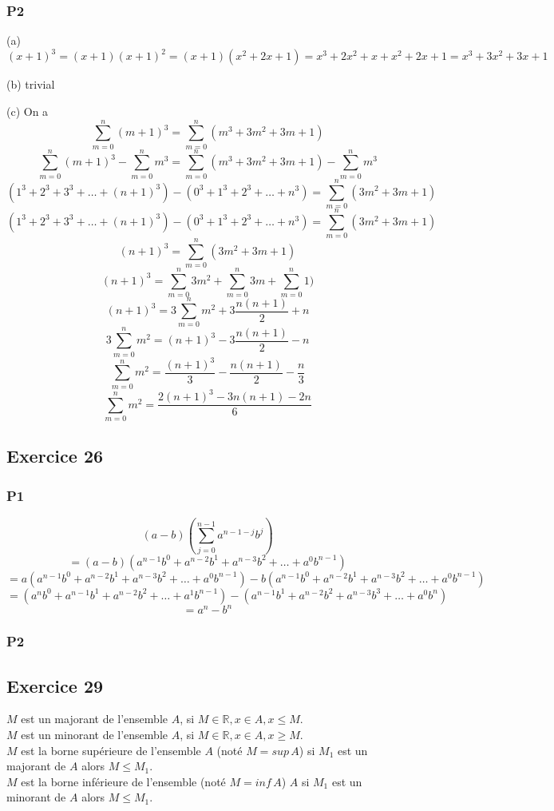 \documentclass[]{book}
\theoremstyle{definition}
\newcommand{\bb}[1]{\mathbb{#1}}
\newcommand{\R}{\bb{R}}
\begin{document}
\subsubsection*{P2}
(a) $$(x+1)^3 = (x+1)(x+1)^2 = (x+1)(x^2+2x+1) = x^3+2x^2+x+x^2+2x+1=x^3+3x^2+3x+1$$


(b) trivial

(c) 
On a 
$$\sum_{m=0}^{n}(m+1)^3 = \sum_{m=0}^{n}(m^3+3m^2+3m+1)$$
$$\sum_{m=0}^{n}(m+1)^3 - \sum_{m=0}^{n}m^3 = \sum_{m=0}^{n}(m^3+3m^2+3m+1) - \sum_{m=0}^{n}m^3 $$
$$(1^3+2^3+3^3+\ldots+(n+1)^3)-(0^3+1^3+2^3+\ldots+n^3) = \sum_{m=0}^{n}(3m^2+3m+1)$$
$$(1^3+2^3+3^3+\ldots+(n+1)^3)-(0^3+1^3+2^3+\ldots+n^3) = \sum_{m=0}^{n}(3m^2+3m+1)$$
$$(n+1)^3 = \sum_{m=0}^{n}(3m^2+3m+1)$$
$$(n+1)^3 = \sum_{m=0}^{n}3m^2+\sum_{m=0}^{n}3m+\sum_{m=0}^{n}1)$$
$$(n+1)^3 = 3\sum_{m=0}^{n}m^2+3\frac{n(n+1)}{2}+n$$
$$3\sum_{m=0}^{n}m^2 = (n+1)^3 - 3\frac{n(n+1)}{2} -n$$
$$\sum_{m=0}^{n}m^2 = \frac{(n+1)^3}{3} - \frac{n(n+1)}{2} - \frac{n}{3}$$
$$\sum_{m=0}^{n}m^2 = \frac{2(n+1)^3 -3n(n+1) -2n}{6}$$

\subsection*{Exercice 26}
\subsubsection*{P1}

$$(a-b)(\sum_{j=0}^{n-1}a^{n-1-j}b^j)$$
$$= (a-b)(a^{n-1}b^{0} + a^{n-2}b^{1} + a^{n-3}b^{2} + \ldots + a^{0}b^{n-1})$$
$$= a(a^{n-1}b^{0} + a^{n-2}b^{1} + a^{n-3}b^{2} + \ldots + a^{0}b^{n-1}) - b(a^{n-1}b^{0} + a^{n-2}b^{1} + a^{n-3}b^{2} + \ldots + a^{0}b^{n-1})$$
$$= (a^{n}b^{0} + a^{n-1}b^{1} + a^{n-2}b^{2} + \ldots + a^{1}b^{n-1}) - (a^{n-1}b^{1} + a^{n-2}b^{2} + a^{n-3}b^{3} + \ldots + a^{0}b^{n})$$
$$= a^n - b^n$$

\subsubsection*{P2}


\subsection*{Exercice 29}
$M$ est un majorant de l'ensemble $A$, si $M \in \R, x \in A , x \le M$. \\
$M$ est un minorant de l'ensemble $A$, si $M \in \R, x \in A , x \ge M$. \\
$M$ est la borne sup\'erieure de l'ensemble $A$ (not\'e $M = sup\, A$) si $M_1$ est un majorant de $A$ alors $M \le M_1$.\\
$M$ est la borne inf\'erieure de l'ensemble (not\'e $M = inf\, A$) $A$ si $M_1$ est un minorant de $A$ alors $M \le M_1$.\\
\end{document}
